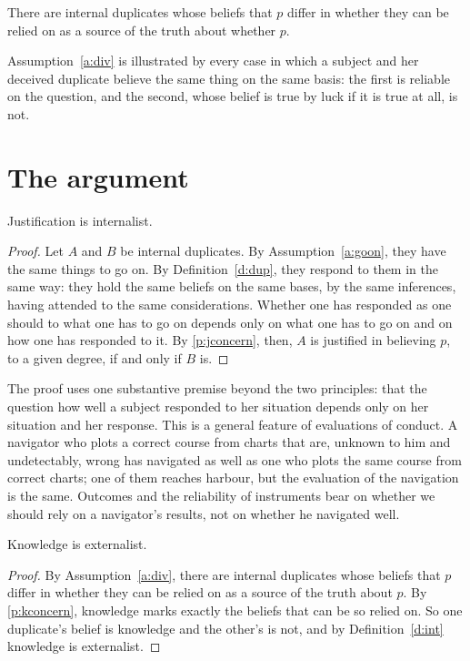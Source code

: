\documentclass{situationist-preprint}
\begin{document}
\begin{assumption}[Divergence]\label{a:div}
There are internal duplicates whose beliefs that $p$ differ in whether they can be relied on as a source of the truth about whether $p$.
\end{assumption}

Assumption~\ref{a:div} is illustrated by every case in which a subject and her deceived duplicate believe the same thing on the same basis: the first is reliable on the question, and the second, whose belief is true by luck if it is true at all, is not.

\section{The argument}

\begin{lemma}\label{l:j}
Justification is internalist.
\end{lemma}

\begin{proof}
Let $A$ and $B$ be internal duplicates. By Assumption~\ref{a:goon}, they have the same things to go on. By Definition~\ref{d:dup}, they respond to them in the same way: they hold the same beliefs on the same bases, by the same inferences, having attended to the same considerations. Whether one has responded as one should to what one has to go on depends only on what one has to go on and on how one has responded to it. By \ref{p:jconcern}, then, $A$ is justified in believing $p$, to a given degree, if and only if $B$ is.
\end{proof}

The proof uses one substantive premise beyond the two principles: that the question how well a subject responded to her situation depends only on her situation and her response. This is a general feature of evaluations of conduct. A navigator who plots a correct course from charts that are, unknown to him and undetectably, wrong has navigated as well as one who plots the same course from correct charts; one of them reaches harbour, but the evaluation of the navigation is the same. Outcomes and the reliability of instruments bear on whether we should rely on a navigator's results, not on whether he navigated well.

\begin{lemma}\label{l:k}
Knowledge is externalist.
\end{lemma}

\begin{proof}
By Assumption~\ref{a:div}, there are internal duplicates whose beliefs that $p$ differ in whether they can be relied on as a source of the truth about $p$. By \ref{p:kconcern}, knowledge marks exactly the beliefs that can be so relied on. So one duplicate's belief is knowledge and the other's is not, and by Definition~\ref{d:int} knowledge is externalist.
\end{proof}
\end{document}
